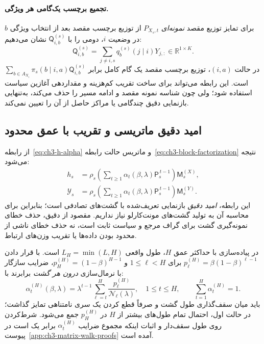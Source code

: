 \paragraph{تجمیع برچسب یک‌گامی هر ویژگی.}
برای تمایز توزیع مقصد \emph{نمونه‌ای} $P_{X_s,t}$ از توزیع برچسب مقصد بعد از انتخاب ویژگی $b$ در وضعیت $i$، دومی را با $\mathsf Q_{i,b}^{(s)}$ نشان می‌دهیم:
\begin{equation}\label{eq:ch3-feature-one-step-Q}
\boxed{\mathsf Q_{i,b}^{(s)}
=\sum_{j\ne i,s}q_b^{(s)}(j\mid i)Y_{j,:}
\in\mathbb R^{1\times K}.}
\end{equation}
در حالت $(i,a)$، توزیع برچسب مقصد یک گام کامل برابر
$\sum_{b\in A_{X_i}}\pi_s(b\mid i,a)\mathsf Q_{i,b}^{(s)}$
است. این رابطه می‌تواند برای ساخت تقریب کم‌هزینه و مقداردهی آغازین سیاست استفاده شود؛ ولی چون شناسه نمونه مقصد و ادامه مسیر را حذف می‌کند، به‌تنهایی بازنمایی دقیق چندگامی یا مراکز حاصل از آن را تعیین نمی‌کند.

\subsection{امید دقیق ماتریسی و تقریب با عمق محدود}
\label{subsec:ch3-exact-matrix-walk}
از رابطه~\eqref{eq:ch3-h-alpha} و ماتریس حالت رابطه~\eqref{eq:ch3-block-factorization} نتیجه می‌شود:
\begin{equation}\label{eq:ch3-exact-matrix-neighborhood}
\boxed{\begin{aligned}
h_s&=\rho_s\left(\sum_{t\ge1}
\alpha_t(\beta,\lambda)\mathsf P_s^{\,t-1}\right)\mathsf M_s^{(X)},\\
\mathscr Y_s&=\rho_s\left(\sum_{t\ge1}
\alpha_t(\beta,\lambda)\mathsf P_s^{\,t-1}\right)\mathsf M_s^{(Y)}.
\end{aligned}}
\end{equation}
این رابطه، \emph{امید دقیق} بازنمایی تعریف‌شده با گشت‌های تصادفی است؛ بنابراین برای محاسبه آن به تولید گشت‌های مونت‌کارلو نیاز نداریم. مقصود از دقیق، حذف خطای نمونه‌گیری گشت برای گراف مرجع و سیاست ثابت است، نه حذف خطای ناشی از محدود بودن داده‌ها یا تقریب وزن‌های ارتباط.

در پیاده‌سازی با حداکثر عمق $H$، طول واقعی $L_H=\min(L,H)$ است. با قرار دادن
$p_\ell^{(H)}=\beta(1-\beta)^{\ell-1}$ برای $1\le\ell<H$
و $p_H^{(H)}=(1-\beta)^{H-1}$، ضرایب سازگار با نرمال‌سازی \emph{درون هر گشت} برابرند با:
\begin{equation}\label{eq:ch3-capped-alpha}
\boxed{\alpha_t^{(H)}(\beta,\lambda)=
\lambda^{t-1}\sum_{\ell=t}^{H}
\frac{p_\ell^{(H)}}{\mathcal N_\ell(\lambda)},\quad
1\le t\le H,\qquad
\sum_{t=1}^{H}\alpha_t^{(H)}=1.}
\end{equation}
باید میان سقف‌گذاری طول گشت و صرفاً قطع کردن یک سری نامتناهی تمایز گذاشت؛ در حالت اول، احتمال تمام طول‌های بیشتر از $H$ در $p_H^{(H)}$ جمع می‌شود. شرط‌کردن روی طول سقف‌دار و اثبات اینکه مجموع ضرایب $\alpha_t^{(H)}$ برابر یک است در پیوست~\ref{app:ch3-matrix-walk-proofs} آمده است.

